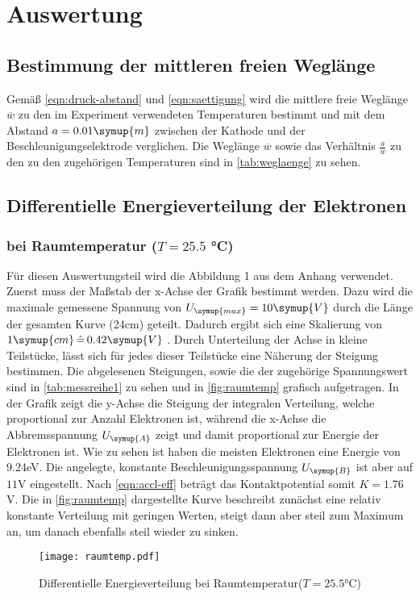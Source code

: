 \section{Auswertung}
\label{sec:Auswertung}
    \subsection{Bestimmung der mittleren freien Weglänge}
    Gemäß \eqref{eqn:druck-abstand} und \eqref{eqn:saettigung} wird die mittlere freie Weglänge $\overline{w}$ zu den im Experiment verwendeten Temperaturen bestimmt und mit dem Abstand $a = 0.01 \symup{m}$
    zwischen der Kathode und der Beschleunigungselektrode verglichen. Die Weglänge $\overline{w}$ sowie das Verhältnis $\frac{a}{\overline{w}}$
    zu den zu den zugehörigen Temperaturen sind in \autoref{tab:weglaenge} zu sehen. 
    


    \subsection{Differentielle Energieverteilung der Elektronen}
        \subsubsection{bei Raumtemperatur ($T = 25.5 $ °C)}
        \label{sec:raumtemp}
        Für diesen Auswertungsteil wird die Abbildung 1 aus dem Anhang verwendet. Zuerst muss der Maßstab der x-Achse der Grafik bestimmt werden.
        Dazu wird die maximale gemessene Spannung von $U_{\symup{max}} = 10 \symup{V}$ durch die Länge der gesamten Kurve (24cm) geteilt.
        Dadurch ergibt sich eine Skalierung von $1 \symup{cm} \, \hat{=} \, 0.42 \symup{V}$ . Durch Unterteilung der Achse 
        in kleine Teilstücke, lässt sich für jedes dieser Teilstücke eine Näherung der Steigung bestimmen. Die abgelesenen Steigungen, sowie
        die der zugehörige Spannungswert sind in \autoref{tab:messreihe1} zu sehen und in \autoref{fig:raumtemp} grafisch aufgetragen.
        In der Grafik zeigt die y-Achse die Steigung der integralen Verteilung, welche proportional zur Anzahl Elektronen ist, während die x-Achse
        die Abbremsspannung $U_{\symup{A}}$ zeigt und damit proportional zur Energie der Elektronen ist.
        Wie zu sehen ist haben die meisten Elektronen eine Energie von $9.24$eV. Die angelegte, konstante Beschleunigungsspannung $U_{\symup{B}}$
        ist aber auf $11$V eingestellt. Nach \eqref{eqn:accl-eff} beträgt das Kontaktpotential somit $K = 1.76$V. Die in \autoref{fig:raumtemp} dargestellte 
        Kurve beschreibt zunächst eine relativ konstante Verteilung mit geringen Werten, steigt dann aber steil zum Maximum an, um danach ebenfalls steil
        wieder zu sinken.
        
        \begin{figure}
          \centering
          \texttt{[image: raumtemp.pdf]}
          \caption{Differentielle Energieverteilung bei Raumtemperatur($T = 25.5$°C)}
          \label{fig:raumtemp}
        \end{figure}


